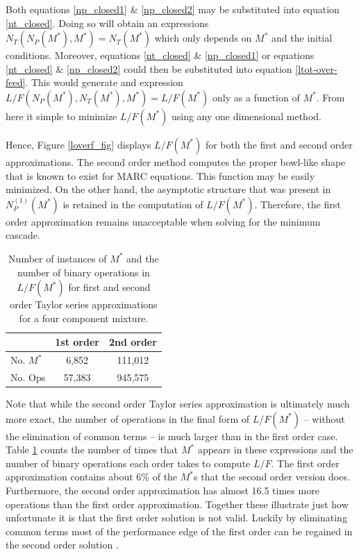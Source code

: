 \documentclass{ansconf}
\begin{document}
Both equations \ref{np_closed1} \& \ref{np_closed2} may be substituted into 
equation \ref{nt_closed}.
Doing so will obtain an expressions $N_T(N_P(M^*),M^*)=N_T(M^*)$ which only depends on $M^*$ and 
the initial conditions.  Moreover, equations \ref{nt_closed} \& \ref{np_closed1} or 
equations \ref{nt_closed} \& \ref{np_closed2} could  then be substituted into 
equation \ref{ltot-over-feed}.   This would generate and expression 
$L/F(N_P(M^*),N_T(M^*),M^*)=L/F(M^*)$ only as a function of $M^*$.  From here it 
simple to minimize $L/F(M^*)$ using any one dimensional method.

Hence, Figure \ref{loverf_fig} displays $L/F(M^*)$ for both the first and second order
approximations.  The second order method computes the proper bowl-like shape that is
known to exist for MARC equations.  This function may be easily minimized.  
On the other hand, the asymptotic 
structure that was present in $N_P^{(1)}(M^*)$ is retained in the computation of 
$L/F(M^*)$.  Therefore, the first order approximation remains unacceptable when
solving for the minimum cascade.

\begin{table}[htbp]
\begin{center}
\caption{Number of instances of $M^*$ and the number of binary operations in 
         $L/F(M^*)$ for first and second order Taylor series approximations for a 
         four component mixture.}
\begin{tabular}{|l||c|c|}
\hline
& \bf{1st order} & \bf{2nd order} \\
\hline
No. $M^*$ & 6,852  &  111,012 \\ 
\hline
No. Ops   & 57,383 &  945,575 \\ 
\hline
\end{tabular}
\label{count_ops}
\end{center}
\end{table}


Note that while the second order Taylor series approximation is ultimately much more 
exact, the number of operations in the final form of $L/F(M^*)$ -- without the 
elimination of common terms -- is much larger than 
in the first order case.  Table \ref{count_ops} counts the number of times
that $M^*$ appears in these expressions and the number of binary operations each 
order takes to compute $L/F$.  
 The first order approximation contains about 6\% of the
$M^*$s that the second order version does.  Furthermore, the second order 
approximation has almost 16.5 times more operations than the first order 
approximation.  Together these illustrate just how unfortunate it is that the first
order solution is not valid.  Luckily by eliminating common terms most of the 
performance edge of the first order can be regained in the second order solution
\cite{Scopatz2012}.
\end{document}
